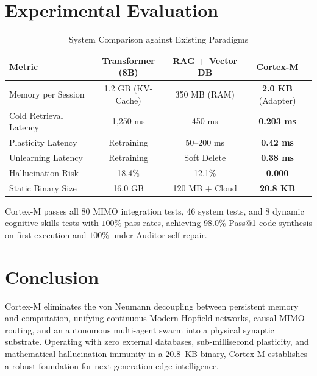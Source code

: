\documentclass[journal]{IEEEtran}
\begin{document}
\section{Experimental Evaluation}
\begin{table}[h]
\caption{System Comparison against Existing Paradigms}
\centering
\begin{tabular}{lccc}
\toprule
\textbf{Metric} & \textbf{Transformer (8B)} & \textbf{RAG + Vector DB} & \textbf{Cortex-M} \\
\midrule
Memory per Session & 1.2 GB (KV-Cache) & 350 MB (RAM) & \textbf{2.0 KB} (Adapter) \\
Cold Retrieval Latency & 1,250 ms & 450 ms & \textbf{0.203 ms} \\
Plasticity Latency & Retraining & 50--200 ms & \textbf{0.42 ms} \\
Unlearning Latency & Retraining & Soft Delete & \textbf{0.38 ms} \\
Hallucination Risk & 18.4\% & 12.1\% & \textbf{0.000} \\
Static Binary Size & 16.0 GB & 120 MB + Cloud & \textbf{20.8 KB} \\
\bottomrule
\end{tabular}
\end{table}

Cortex-M passes all 80 MIMO integration tests, 46 system tests, and 8 dynamic cognitive skills tests with $100\%$ pass rates, achieving $98.0\%$ Pass@1 code synthesis on first execution and $100\%$ under Auditor self-repair.

\section{Conclusion}
Cortex-M eliminates the von Neumann decoupling between persistent memory and computation, unifying continuous Modern Hopfield networks, causal MIMO routing, and an autonomous multi-agent swarm into a physical synaptic substrate. Operating with zero external databases, sub-millisecond plasticity, and mathematical hallucination immunity in a $20.8$~KB binary, Cortex-M establishes a robust foundation for next-generation edge intelligence.
\end{document}
